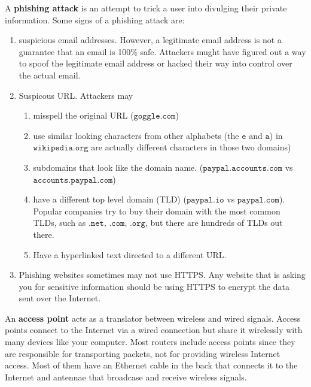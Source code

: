 \documentclass{article}
\newcounter{definition}[section]
\begin{document}
  A \textbf{phishing attack} is an attempt to trick a user into divulging their private information. Some signs of a phishing attack are: 
  \begin{enumerate}
      \item suspicious email addresses. However, a legitimate email address is not a guarantee that an email is 100\% safe. Attackers mught have figured out a way to spoof the legitimate email address or hacked their way into control over the actual email. 
      \item Suspicous URL. Attackers may
      \begin{enumerate}
          \item misspell the original URL ($\texttt{goggle.com}$)
          \item use similar looking characters from other alphabets (the $\texttt{e}$ and $\texttt{a}$) in $\texttt{wikipedia.org}$ are actually different characters in those two domains)
          \item subdomains that look like the domain name. ($\texttt{paypal.accounts.com}$ vs $\texttt{accounts.paypal.com}$)
          \item have a different top level domain (TLD) ($\texttt{paypal.io}$ vs $\texttt{paypal.com}$). Popular companies try to buy their domain with the most common TLDs, such as $\texttt{.net, .com, .org}$, but there are hundreds of TLDs out there. 
          \item Have a hyperlinked text directed to a different URL. 
      \end{enumerate} 
      \item Phishing websites sometimes may not use HTTPS. Any website that is asking you for sensitive information should be using HTTPS to encrypt the data sent over the Internet.
  \end{enumerate}

  \begin{definition}
    \label{def:access-point}
  An \textbf{access point} acts as a translator between wireless and wired signals. Access points connect to the Internet via a wired connection but share it wirelessly with many devices like your computer. Most routers include access points since they are responsible for transporting packets, not for providing wireless Internet access. Most of them have an Ethernet cable in the back that connects it to the Internet and antennae that broadcase and receive wireless signals. 
  \end{definition}
\end{document}
